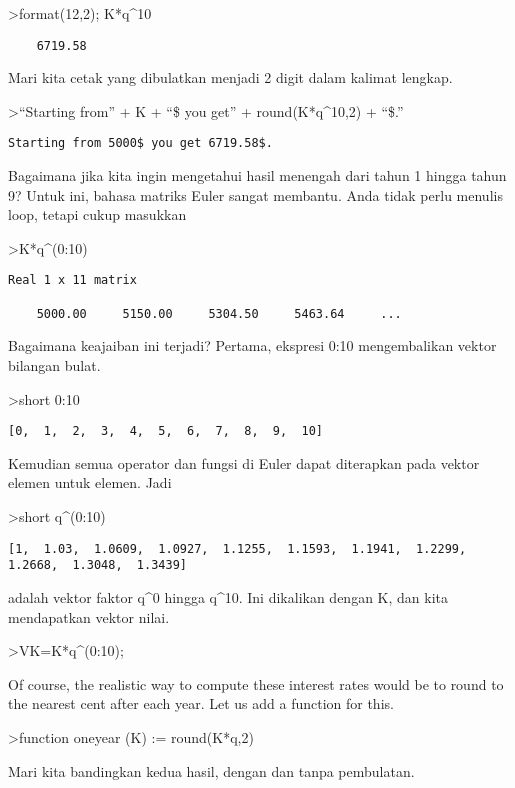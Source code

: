 \documentclass[
]{book}
\begin{document}
\textgreater format(12,2); K*q\^{}10

\begin{verbatim}
    6719.58 
\end{verbatim}

Mari kita cetak yang dibulatkan menjadi 2 digit dalam kalimat lengkap.

\textgreater{}``Starting from'' + K + ``\$ you get'' + round(K*q\^{}10,2) + ``\$.''

\begin{verbatim}
Starting from 5000$ you get 6719.58$.
\end{verbatim}

Bagaimana jika kita ingin mengetahui hasil menengah dari tahun 1 hingga tahun 9? Untuk ini, bahasa matriks Euler sangat membantu. Anda tidak perlu menulis loop, tetapi cukup masukkan

\textgreater K*q\^{}(0:10)

\begin{verbatim}
Real 1 x 11 matrix

    5000.00     5150.00     5304.50     5463.64     ...
\end{verbatim}

Bagaimana keajaiban ini terjadi? Pertama, ekspresi 0:10 mengembalikan vektor bilangan bulat.

\textgreater short 0:10

\begin{verbatim}
[0,  1,  2,  3,  4,  5,  6,  7,  8,  9,  10]
\end{verbatim}

Kemudian semua operator dan fungsi di Euler dapat diterapkan pada vektor elemen untuk elemen. Jadi

\textgreater short q\^{}(0:10)

\begin{verbatim}
[1,  1.03,  1.0609,  1.0927,  1.1255,  1.1593,  1.1941,  1.2299,
1.2668,  1.3048,  1.3439]
\end{verbatim}

adalah vektor faktor q\^{}0 hingga q\^{}10. Ini dikalikan dengan K, dan kita mendapatkan vektor nilai.

\textgreater VK=K*q\^{}(0:10);

Of course, the realistic way to compute these interest rates would be to round to the nearest cent after each year. Let us add a function for this.

\textgreater function oneyear (K) := round(K*q,2)

Mari kita bandingkan kedua hasil, dengan dan tanpa pembulatan.
\end{document}
